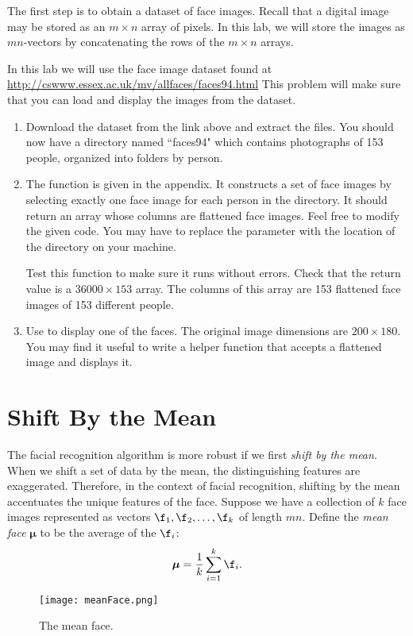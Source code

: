 The first step is to obtain a dataset of face images.
Recall that a digital image may be stored as an $m \times n$ array of pixels.
In this lab, we will store the images as $mn$-vectors by concatenating the rows of the $m \times n$ arrays.

\begin{problem}
\label{prob:getTrainingFaces}
In this lab we will use the  face image dataset found at \url{http://cswww.essex.ac.uk/mv/allfaces/faces94.html}
This problem will make sure that you can load and display the images from the dataset.
\begin{enumerate}
\item Download the  dataset from the link above and extract the files.
You should now have a directory named ``faces94" which contains photographs of 153 people, organized into folders by person.

\item The function  is given in the appendix. %
It constructs a set of face images by selecting exactly one face image for each person in the directory.
It should return an array whose columns are flattened face images.
Feel free to modify the given code.
You may have to replace the parameter  with the location of the directory  on your machine.

Test this function to make sure it runs without errors.
Check that the return value  is a $36000 \times 153$ array.
The columns of this array are 153 flattened face images of 153 different people.

\item Use  to display one of the faces.
The original image dimensions are $200 \times 180$.
You may find it useful to write a helper function that accepts a flattened image and displays it.

\end{enumerate}
\end{problem}


\section*{Shift By the Mean} %

The facial recognition algorithm is more robust if we first \emph{shift by the mean}. When we shift a set of data by the mean, the distinguishing features are exaggerated. Therefore, in the context of facial recognition, shifting by the mean accentuates the unique features of the face.
Suppose we have a collection of $k$ face images represented as vectors $\f_1, \f_2, \ldots, \f_k$ of length $mn$.
Define the \emph{mean face} ${\boldsymbol \mu}$ to be the average of the $\f_i$:
\[
{\boldsymbol \mu} = \frac{1}{k}\sum_{i=1}^k \f_i.
\]
\begin{figure}
\texttt{[image: meanFace.png]}
\caption{The mean face.}
\label{facialRecognition:meanFace}
\end{figure}


